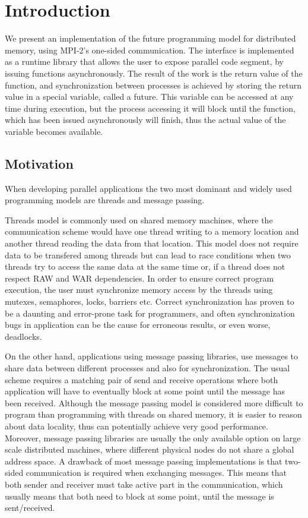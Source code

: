 \chapter{Introduction}
We present an implementation of the future programming model for distributed memory,
using MPI-2's one-sided communication.  The interface is implemented as a runtime 
library that allows the user to  expose parallel code segment, by issuing functions 
asynchronously.  The result of the work is the return value of the function, and 
synchronization between processes is achieved by storing the return value in a special
variable, called a future.  This variable can be accessed at any time during execution,
but the process accessing it will block until the function, which has been issued asynchronously
will finish, thus the actual value of the variable becomes available. 


\section{Motivation}
	When developing parallel applications the two most dominant and widely used programming models are 
threads and message passing.  


Threads model is commonly used on shared memory machines, where 
the communication scheme would have one thread writing to a memory location
and another thread reading the data from that location.  This model does not require data to be
transfered among threads but can lead to race conditions when two threads try to access the same
data at the same time or, if a thread does not respect RAW and WAR dependencies. 
In order to ensure correct program execution,
the user must synchronize memory access by the threads using mutexes, semaphores, locks, barriers etc.
Correct synchronization has proven to be a daunting and error-prone task for programmers, and often 
synchronization bugs in application can be the cause for  
erroneous results, or even worse, deadlocks.  


On the other hand,  applications using message passing libraries, use messages to share data
between different processes and also for synchronization.  The usual scheme requires a matching pair
of send and receive operations where both application will have to eventually block at some point until
the message has been received. Although the message passing model is considered more difficult to program 
than programming with threads on shared memory, it is easier to reason about data locality, thus can 
potentially achieve very good performance.  Moreover, message passing libraries are usually the only 
available option on large scale distributed machines, where different physical nodes do not share 
a global address space.  A drawback of most message passing implementations is that two-sided 
communication is required when exchanging messages.  This means that both sender and receiver must
take active part in the communication, which usually means that both need to block at some point,
until the message is sent/received.  



